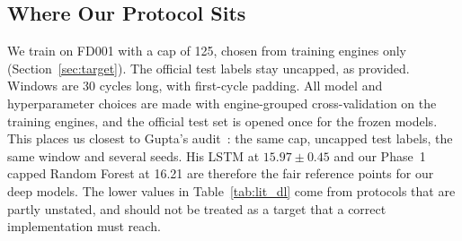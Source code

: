 \subsection{Where Our Protocol Sits}
We train on FD001 with a cap of 125, chosen from training engines only
(Section~\ref{sec:target}). The official test labels stay uncapped, as
provided. Windows are 30 cycles long, with first-cycle padding. All model and
hyperparameter choices are made with engine-grouped cross-validation on the
training engines, and the official test set is opened once for the frozen
models. This places us closest to Gupta's audit~\cite{Gupta2026auditing}: the
same cap, uncapped test labels, the same window and several seeds. His LSTM at
$15.97\pm0.45$ and our Phase~1 capped Random Forest at 16.21 are therefore the
fair reference points for our deep models. The lower values in
Table~\ref{tab:lit_dl} come from protocols that are partly unstated, and
should not be treated as a target that a correct implementation must reach.
